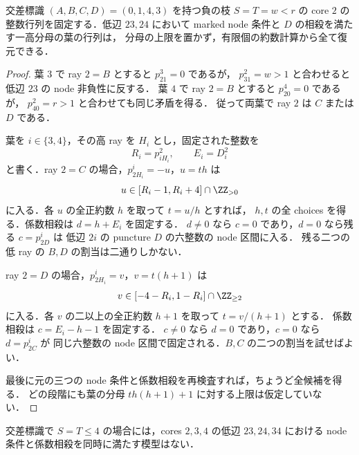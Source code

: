 \begin{lemma}
\label{tl15:finite-leaves}
交差標識 $(A,B,C,D)=(0,1,4,3)$ を持つ負の枝 $S=T=w<r$ の
core $2$ の整数行列を固定する．低辺 $23,24$ において
marked node 条件と $D$ の相殺を満たす一高分母の葉の行列は，
分母の上限を置かず，有限個の約数計算から全て復元できる．
\end{lemma}

\begin{proof}
葉 $3$ で ray $2=B$ とすると $p^3_{21}=0$ であるが，
$p^2_{31}=w>1$ と合わせると低辺 $23$ の node 非負性に反する．
葉 $4$ で ray $2=B$ とすると $p^4_{20}=0$ であるが，
$p^2_{40}=r>1$ と合わせても同じ矛盾を得る．
従って両葉で ray $2$ は $C$ または $D$ である．

葉を $i\in\{3,4\}$，その高 ray を $H_i$ とし，固定された整数を
\[
 R_i=p^2_{iH_i},\qquad E_i=D^2_i
\]
と書く．ray $2=C$ の場合，$p^i_{2H_i}=-u$，$u=th$ は
\[
 u\in[R_i-1,R_i+4]\cap\ZZ_{>0}
\]
に入る．各 $u$ の全正約数 $h$ を取って $t=u/h$ とすれば，
$h,t$ の全 choices を得る．係数相殺は $d=h+E_i$ を固定する．
$d\ne0$ なら $c=0$ であり，$d=0$ なら残る $c=p^i_{2D}$ は
低辺 $2i$ の puncture $D$ の六整数の node 区間に入る．
残る二つの低 ray の $B,D$ の割当は二通りしかない．

ray $2=D$ の場合，$p^i_{2H_i}=v$，$v=t(h+1)$ は
\[
 v\in[-4-R_i,1-R_i]\cap\ZZ_{\ge2}
\]
に入る．各 $v$ の二以上の全正約数 $h+1$ を取って $t=v/(h+1)$ とする．
係数相殺は $c=E_i-h-1$ を固定する．
$c\ne0$ なら $d=0$ であり，$c=0$ なら $d=p^i_{2C}$ が
同じ六整数の node 区間で固定される．$B,C$ の二つの割当を試せばよい．

最後に元の三つの node 条件と係数相殺を再検査すれば，ちょうど全候補を得る．
どの段階にも葉の分母 $th(h+1)+1$ に対する上限は仮定していない．
\end{proof}

\begin{proposition}[小さい負の枝の低三角形は接続しない]
\label{tl15:small-negative}
交差標識で $S=T\le4$ の場合には，cores $2,3,4$ の低辺
$23,24,34$ における node 条件と係数相殺を同時に満たす模型はない．
\end{proposition}


